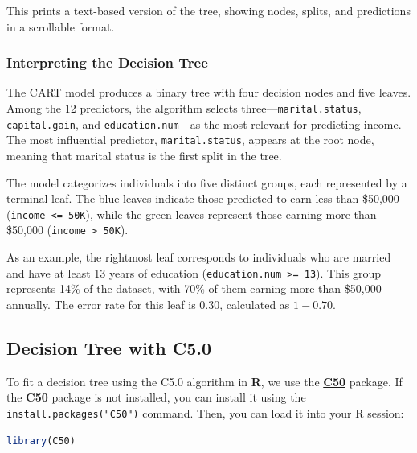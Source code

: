 \documentclass[
]{book}
\newcommand{\passthrough}[1]{#1}
\theoremstyle{definition}
\theoremstyle{definition}
\theoremstyle{definition}
\theoremstyle{definition}
\theoremstyle{remark}
\begin{document}
This prints a text-based version of the tree, showing nodes, splits, and predictions in a scrollable format.

\subsubsection*{Interpreting the Decision Tree}\label{interpreting-the-decision-tree}

The CART model produces a binary tree with four decision nodes and five leaves. Among the 12 predictors, the algorithm selects three---\passthrough{\lstinline!marital.status!}, \passthrough{\lstinline!capital.gain!}, and \passthrough{\lstinline!education.num!}---as the most relevant for predicting income. The most influential predictor, \passthrough{\lstinline!marital.status!}, appears at the root node, meaning that marital status is the first split in the tree.

The model categorizes individuals into five distinct groups, each represented by a terminal leaf. The blue leaves indicate those predicted to earn less than \$50,000 (\passthrough{\lstinline!income <= 50K!}), while the green leaves represent those earning more than \$50,000 (\passthrough{\lstinline!income > 50K!}).

As an example, the rightmost leaf corresponds to individuals who are married and have at least 13 years of education (\passthrough{\lstinline!education.num >= 13!}). This group represents 14\% of the dataset, with 70\% of them earning more than \$50,000 annually. The error rate for this leaf is 0.30, calculated as \(1 - 0.70\).

\subsection*{Decision Tree with C5.0}\label{decision-tree-with-c5.0}

To fit a decision tree using the C5.0 algorithm in \textbf{R}, we use the \href{https://CRAN.R-project.org/package=C50}{\textbf{C50}} package. If the \textbf{C50} package is not installed, you can install it using the \passthrough{\lstinline!install.packages("C50")!} command. Then, you can load it into your R session:

\begin{lstlisting}[language=R]
library(C50)
\end{lstlisting}
\end{document}
